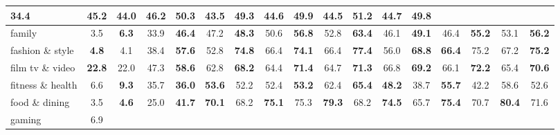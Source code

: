 \begin{table}[t]
{\begin{tabular}{|l|cc|cc|cc|cc|cc|cc|cc|cc|}
  \textbf{34.4} &
  \multicolumn{1}{c|}{\textbf{45.2}} &
  44.0 &
  \multicolumn{1}{c|}{46.2} &
  \textbf{50.3} &
  \multicolumn{1}{c|}{43.5} &
  \textbf{49.3} &
  \multicolumn{1}{c|}{44.6} &
  \textbf{49.9} &
  \multicolumn{1}{c|}{44.5} &
  \textbf{51.2} &
  \multicolumn{1}{c|}{44.7} &
  \textbf{49.8} \\ \hline
family &
  \multicolumn{1}{c|}{3.5} &
  \textbf{6.3} &
  \multicolumn{1}{c|}{33.9} &
  \textbf{46.4} &
  \multicolumn{1}{c|}{47.2} &
  \textbf{48.3} &
  \multicolumn{1}{c|}{50.6} &
  \textbf{56.8} &
  \multicolumn{1}{c|}{52.8} &
  \textbf{63.4} &
  \multicolumn{1}{c|}{46.1} &
  \textbf{49.1} &
  \multicolumn{1}{c|}{46.4} &
  \textbf{55.2} &
  \multicolumn{1}{c|}{53.1} &
  \textbf{56.2} \\ \hline
fashion \& style &
  \multicolumn{1}{c|}{\textbf{4.8}} &
  4.1 &
  \multicolumn{1}{c|}{38.4} &
  \textbf{57.6} &
  \multicolumn{1}{c|}{52.8} &
  \textbf{74.8} &
  \multicolumn{1}{c|}{66.4} &
  \textbf{74.1} &
  \multicolumn{1}{c|}{66.4} &
  \textbf{77.4} &
  \multicolumn{1}{c|}{56.0} &
  \textbf{68.8} &
  \multicolumn{1}{c|}{\textbf{66.4}} &
  75.2 &
  \multicolumn{1}{c|}{67.2} &
  \textbf{75.2} \\ \hline
film tv \& video &
  \multicolumn{1}{c|}{\textbf{22.8}} &
  22.0 &
  \multicolumn{1}{c|}{47.3} &
  \textbf{58.6} &
  \multicolumn{1}{c|}{62.8} &
  \textbf{68.2} &
  \multicolumn{1}{c|}{64.4} &
  \textbf{71.4} &
  \multicolumn{1}{c|}{64.7} &
  \textbf{71.3} &
  \multicolumn{1}{c|}{66.8} &
  \textbf{69.2} &
  \multicolumn{1}{c|}{66.1} &
  \textbf{72.2} &
  \multicolumn{1}{c|}{65.4} &
  \textbf{70.6} \\ \hline
fitness \& health &
  \multicolumn{1}{c|}{6.6} &
  \textbf{9.3} &
  \multicolumn{1}{c|}{35.7} &
  \textbf{36.0} &
  \multicolumn{1}{c|}{\textbf{53.6}} &
  52.2 &
  \multicolumn{1}{c|}{52.4} &
  \textbf{53.2} &
  \multicolumn{1}{c|}{62.4} &
  \textbf{65.4} &
  \multicolumn{1}{c|}{\textbf{48.2}} &
  38.7 &
  \multicolumn{1}{c|}{\textbf{55.7}} &
  42.2 &
  \multicolumn{1}{c|}{58.6} &
  52.6 \\ \hline
food \& dining &
  \multicolumn{1}{c|}{3.5} &
  \textbf{4.6} &
  \multicolumn{1}{c|}{25.0} &
  \textbf{41.7} &
  \multicolumn{1}{c|}{\textbf{70.1}} &
  68.2 &
  \multicolumn{1}{c|}{\textbf{75.1}} &
  75.3 &
  \multicolumn{1}{c|}{\textbf{79.3}} &
  68.2 &
  \multicolumn{1}{c|}{\textbf{74.5}} &
  65.7 &
  \multicolumn{1}{c|}{\textbf{75.4}} &
  70.7 &
  \multicolumn{1}{c|}{\textbf{80.4}} &
  71.6 \\ \hline
gaming &
  \multicolumn{1}{c|}{6.9} &

\end{tabular}}
\end{table}
